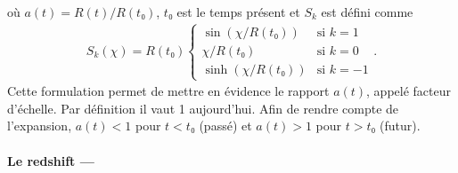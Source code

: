 \documentclass[11pt, twoside, a4paper, openright]{report}
\begin{document}
où $a(t) = R(t) / R(t₀)$,  $t₀$ est le temps présent et $S_{k}$ est défini comme
\begin{align}
  S_{k}(\chi) = R(t₀) \left\{
    \begin{array}{ll}
      \sin(\chi / R(t₀)) & \mbox{si } k = 1 \\
      \chi / R(t₀) & \textrm{si } k = 0 \\
      \sinh(\chi / R(t₀)) & \mbox{si } k = -1
    \end{array}
\right..
\end{align}
Cette formulation permet de mettre en évidence le rapport $a(t)$, appelé facteur d'échelle. Par définition il vaut 1 aujourd'hui. Afin de rendre compte de l'expansion, $a(t) < 1$ pour $t < t₀$ (passé) et $a(t) > 1$ pour $t > t₀$ (futur).

\paragraph{Le redshift —}
\label{par:redshift}
\end{document}
